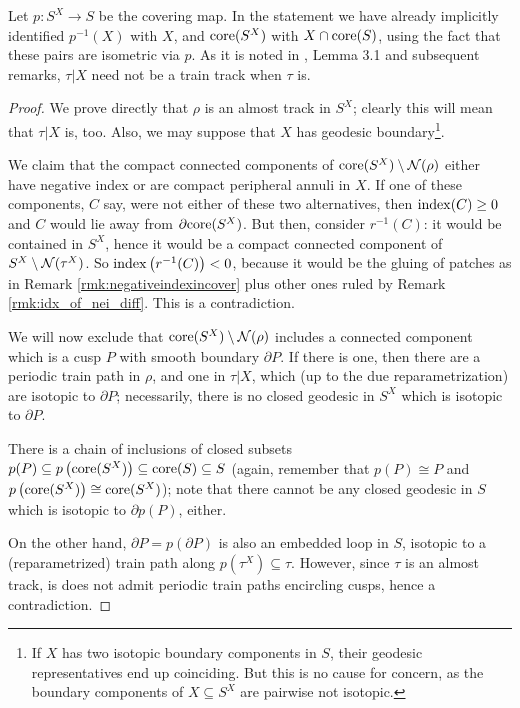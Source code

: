 Let $p:S^X\rightarrow S$ be the covering map. In the statement we have already implicitly identified $p^{-1}(X)$ with $X$, and $\mathrm{core}(S^X)$ with $X\cap \mathrm{core}(S)$, using the fact that these pairs are isometric via $p$. As it is noted in \cite{mms}, Lemma 3.1 and subsequent remarks, $\tau|X$ need not be a train track when $\tau$ is.

\begin{proof}
We prove directly that $\rho$ is an almost track in $S^X$; clearly this will mean that $\tau|X$ is, too. Also, we may suppose that $X$ has geodesic boundary\footnote{If $X$ has two isotopic boundary components in $S$, their geodesic representatives end up coinciding. But this is no cause for concern, as the boundary components of $X\subseteq S^X$ are pairwise not isotopic.}. 

We claim that the compact connected components of $\mathrm{core}(S^X)\setminus{\mathcal N}(\rho)$ either have negative index or are compact peripheral annuli in $X$. If one of these components, $C$ say, were not either of these two alternatives, then $\mathrm{index}(C)\geq 0$ and $C$ would lie away from $\partial \mathrm{core}(S^X)$. But then, consider $r^{-1}(C)$: it would be contained in $S^X$, hence it would be a compact connected component of $S^X\setminus{\mathcal N}(\tau^X)$. So $\mathrm{index}\left(r^{-1}(C)\right)<0$, because it would be the gluing of patches as in Remark \ref{rmk:negativeindexincover} plus other ones ruled by Remark \ref{rmk:idx_of_nei_diff}. This is a contradiction.

We will now exclude that $\mathrm{core}(S^X) \setminus {\mathcal N}(\rho)$ includes a connected component which is a cusp $P$ with smooth boundary $\partial P$. If there is one, then there are a periodic train path in $\rho$, and one in $\tau|X$, which (up to the due reparametrization) are isotopic to $\partial P$; necessarily, there is no closed geodesic in $S^X$ which is isotopic to $\partial P$. 

There is a chain of inclusions of closed subsets $p(P)\subseteq p\left(\mathrm{core}(S^X)\right)\subseteq \mathrm{core}(S)\subseteq S$ (again, remember that $p(P)\cong P$ and $p\left(\mathrm{core}(S^X)\right)\cong \mathrm{core}(S^X)$); note that there cannot be any closed geodesic in $S$ which is isotopic to $\partial p(P)$, either.

On the other hand, $\partial P=p(\partial P)$ is also an embedded loop in $S$, isotopic to a (reparametrized) train path along $p(\tau^X)\subseteq \tau$. However, since $\tau$ is an almost track, is does not admit periodic train paths encircling cusps, hence a contradiction.


\end{proof}

